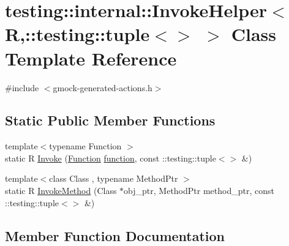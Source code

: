 \hypertarget{classtesting_1_1internal_1_1_invoke_helper_3_01_r_00_1_1testing_1_1tuple_3_4_01_4}{}\section{testing\+:\+:internal\+:\+:Invoke\+Helper$<$ R,\+:\+:testing\+:\+:tuple$<$$>$ $>$ Class Template Reference}
\label{classtesting_1_1internal_1_1_invoke_helper_3_01_r_00_1_1testing_1_1tuple_3_4_01_4}


{\ttfamily \#include $<$gmock-\/generated-\/actions.\+h$>$}

\subsection*{Static Public Member Functions}
\begin{DoxyCompactItemize}
\item 
{\footnotesize template$<$typename Function $>$ }\\static R \hyperlink{classtesting_1_1internal_1_1_invoke_helper_3_01_r_00_1_1testing_1_1tuple_3_4_01_4_aa695e527af9f3efc6c8098c2467e5e7c}{Invoke} (\hyperlink{structtesting_1_1internal_1_1_function}{Function} \hyperlink{_07copy_08_2_undistort_image_8m_aa0b19300b507d475ab9f1525750bc11f}{function}, const \+::testing\+::tuple$<$$>$ \&)
\item 
{\footnotesize template$<$class Class , typename Method\+Ptr $>$ }\\static R \hyperlink{classtesting_1_1internal_1_1_invoke_helper_3_01_r_00_1_1testing_1_1tuple_3_4_01_4_acd2b09ae48134b49f388be348b0d8c72}{Invoke\+Method} (Class $\ast$obj\+\_\+ptr, Method\+Ptr method\+\_\+ptr, const \+::testing\+::tuple$<$$>$ \&)
\end{DoxyCompactItemize}


\subsection{Member Function Documentation}
